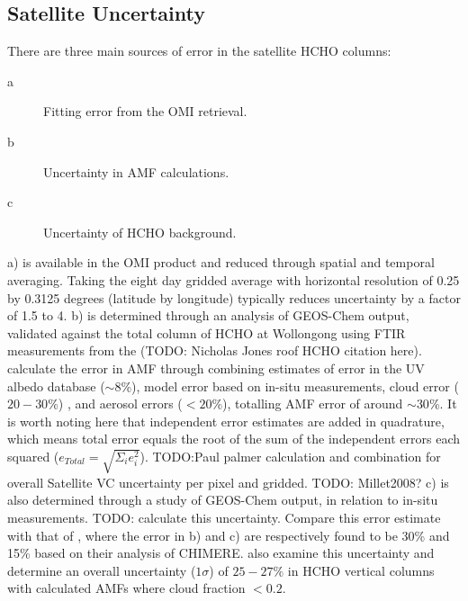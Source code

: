   \subsection{Satellite Uncertainty}
    \label{BioIsop:Uncertianty:Satellite}
    
    There are three main sources of error in the satellite HCHO columns:
    \begin{description}
      \item[a] Fitting error from the OMI retrieval.
      \item[b] Uncertainty in AMF calculations.
      \item[c] Uncertainty of HCHO background.
    \end{description}
    a) is available in the OMI product and reduced through spatial and temporal averaging.
    Taking the eight day gridded average with horizontal resolution of 0.25 by 0.3125 degrees (latitude by longitude) typically reduces uncertainty by a factor of 1.5 to 4.
    b) is determined through an analysis of GEOS-Chem output, validated against the total column of HCHO at Wollongong using FTIR measurements from the (TODO: Nicholas Jones roof HCHO citation here).
    \textcite{Palmer2006} calculate the error in AMF through combining estimates of error in the UV albedo database ($\sim 8$\%), model error based on in-situ measurements, cloud error  ($20-30$\%) \parencite{Martin2003}, and aerosol errors ($<20$\%), totalling AMF error of around $\sim 30$\%.
    It is worth noting here that independent error estimates are added in quadrature, which means total error equals the root of the sum of the independent errors each squared ($e_{Total}=\sqrt{\Sigma_i e_i^2}$).
    TODO:Paul palmer calculation and combination for overall Satellite VC uncertainty per pixel and gridded.
    TODO: Millet2008?
    c) is also determined through a study of GEOS-Chem output, in relation to in-situ measurements.
    TODO: calculate this uncertainty.
    Compare this error estimate with that of \textcite{Curci2010}, where the error in b) and c) are respectively found to be 30\% and 15\% based on their analysis of CHIMERE.
    \textcite{Millet2008} also examine this uncertainty and determine an overall uncertainty ($1\sigma$) of $25-27\%$ in HCHO vertical columns with calculated AMFs where cloud fraction $< 0.2$.
    
